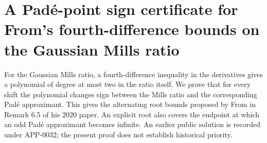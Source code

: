 \documentclass[11pt,a4paper]{article}
\numberwithin{equation}{section}
\theoremstyle{definition}
\theoremstyle{remark}
\newenvironment{sectionabstract}{\par\smallskip\begingroup\small\noindent}{\par\endgroup\medskip}
\begin{document}
\section{\texorpdfstring{A Pad\'e-point sign certificate for From's fourth-difference bounds on the Gaussian Mills ratio}{A Pad\'e-point sign certificate for From's fourth-difference bounds on the Gaussian Mills ratio}}\label{section:r34heisei}
\par\medskip


\begin{sectionabstract}
For the Gaussian Mills ratio, a fourth-difference inequality in the
derivatives gives a polynomial of degree at most two in the ratio itself.
We prove that for every shift the polynomial changes sign between the
Mills ratio and the corresponding Pad\'e approximant. This gives the
alternating root bounds proposed by From in Remark 6.5 of his 2020 paper.
An explicit root also covers the endpoint at which an odd Pad\'e approximant
becomes infinite. An earlier public solution is recorded under APP-0032;
the present proof does not establish historical priority.
\end{sectionabstract}
\end{document}
